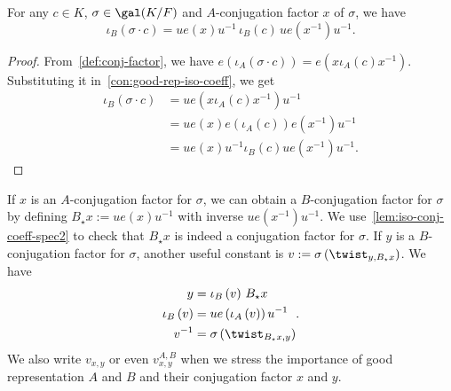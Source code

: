 \begin{lemma}\label{lem:iso-conj-coeff-spec2}
  For any $c \in K$, $\sigma\in\gal(K/F)$ and $A$-conjugation factor $x$ of $\sigma$, we have
  \[
    \iota_{B}\left(\sigma\cdot c\right) = ue(x)u^{-1}\,\iota_{B}(c)\,ue\left(x^{-1}\right)u^{-1}.
  \]
  \leanok
\end{lemma}
\begin{proof}
  From~\cref{def:conj-factor}, we have $e\left(\iota_{A}(\sigma \cdot c)\right) = e\left(x\iota_{A}(c)x^{-1}\right)$. Substituting it in~\cref{con:good-rep-iso-coeff}, we get
  \[
    \begin{aligned}
      \iota_{B}(\sigma \cdot c) &= ue\left(x\iota_{A}(c)x^{-1}\right)u^{-1}\\
                                &= ue(x)e\left(\iota_{A}(c)\right)e\left(x^{-1}\right)u^{-1}\\
      &= ue(x)u^{-1}\iota_{B}(c)ue\left(x^{-1}\right)u^{-1}.
    \end{aligned}
  \]
\end{proof}

\begin{construction}
  \label{con:push-forward-conj-factor}
  If $x$ is an $A$-conjugation factor for $\sigma$, we can obtain a $B$-conjugation factor for $\sigma$ by defining $B_{\star}x := ue(x)u^{-1}$ with inverse $ue\left(x^{-1}\right)u^{-1}$. We use~\cref{lem:iso-conj-coeff-spec2} to check that $B_{\star}x$ is indeed a conjugation factor for $\sigma$. If $y$ is a $B$-conjugation factor for $\sigma$, another useful constant is $v := \sigma\left(\twist_{y, B_{\star}x}\right)$. We have
  \[
    \begin{aligned}
    y &= \iota_{B}\left(v\right)\, B_{\star}x \\
      \iota_{B}\left(v\right) &= u e\left(\iota_{A}\left(v\right)\right)u^{-1}\\
      v^{-1} &= \sigma\left(\twist_{B_{\star}x, y}\right)
    \end{aligned}.
  \]
  We also write $v_{x,y}$ or even $v^{A,B}_{x, y}$ when we stress the importance of good representation $A$ and $B$ and their conjugation factor $x$ and $y$.
\end{construction}

